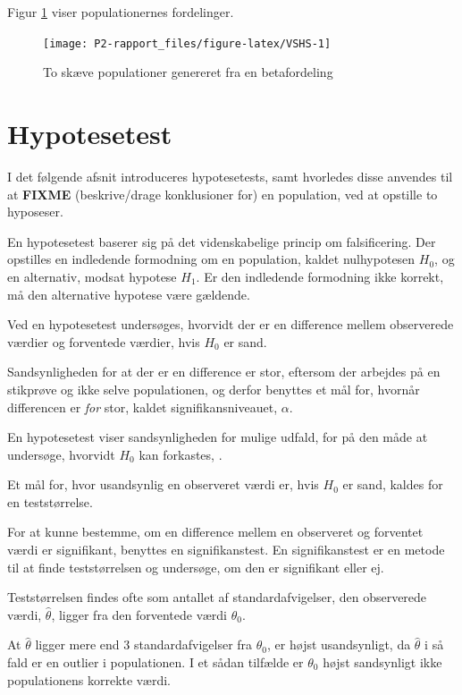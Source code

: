 \documentclass[
]{book}
\theoremstyle{definition}
\theoremstyle{definition}
\theoremstyle{definition}
\theoremstyle{remark}
\begin{document}
Figur \ref{fig:VSHS} viser populationernes fordelinger.

\begin{figure}

{\centering \texttt{[image: P2-rapport\_files/figure-latex/VSHS-1]} 

}

\caption{To skæve populationer genereret fra en betafordeling}\label{fig:VSHS}
\end{figure}

\hypertarget{hypotesetest}{%
\chapter{Hypotesetest}\label{hypotesetest}}

I det følgende afsnit introduceres hypotesetests, samt hvorledes disse anvendes til at \textbf{FIXME} (beskrive/drage konklusioner for) en population, ved at opstille to hyposeser.

En hypotesetest baserer sig på det videnskabelige princip om falsificering. Der opstilles en indledende formodning om en population, kaldet nulhypotesen \(H_0\), og en alternativ, modsat hypotese \(H_1\). Er den indledende formodning ikke korrekt, må den alternative hypotese være gældende.

Ved en hypotesetest undersøges, hvorvidt der er en difference mellem observerede værdier og forventede værdier, hvis \(H_0\) er sand.

Sandsynligheden for at der er en difference er stor, eftersom der arbejdes på en stikprøve og ikke selve populationen, og derfor benyttes et mål for, hvornår differencen er \emph{for} stor, kaldet signifikansniveauet, \(\alpha\).

En hypotesetest viser sandsynligheden for mulige udfald, for på den måde at undersøge, hvorvidt \(H_0\) kan forkastes, \citep{HvorforHYPO}.

Et mål for, hvor usandsynlig en observeret værdi er, hvis \(H_0\) er sand, kaldes for en teststørrelse.

For at kunne bestemme, om en difference mellem en observeret og forventet værdi er signifikant, benyttes en signifikanstest. En signifikanstest er en metode til at finde teststørrelsen og undersøge, om den er signifikant eller ej.

Teststørrelsen findes ofte som antallet af standardafvigelser, den observerede værdi, \(\hat \theta\), ligger fra den forventede værdi \(\theta_0\).

At \(\hat \theta\) ligger mere end \(3\) standardafvigelser fra \(\theta_0\), er højst usandsynligt, da \(\hat \theta\) i så fald er en outlier i populationen. I et sådan tilfælde er \(\theta_0\) højst sandsynligt ikke populationens korrekte værdi.
\end{document}
